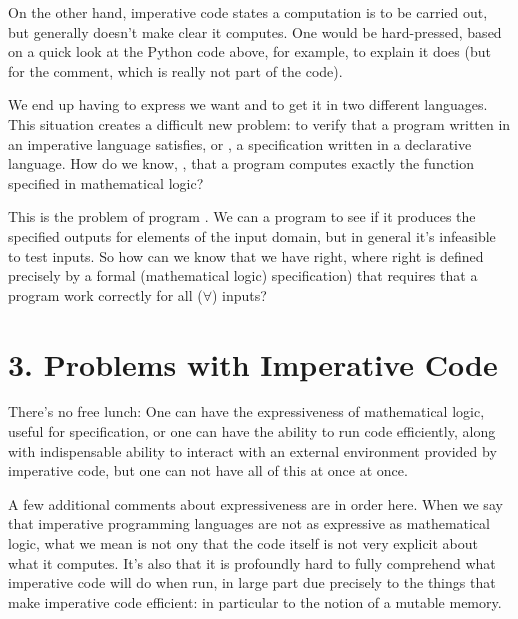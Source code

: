 \documentclass[letterpaper,10pt,english]{sphinxmanual}
\begin{document}
On the other hand, imperative code states  a computation is to be
carried out, but generally doesn’t make clear  it computes. One
would be hard-pressed, based on a quick look at the Python code above,
for example, to explain  it does (but for the comment, which is
really not part of the code).

We end up having to express  we want and  to get it in two
different languages. This situation creates a difficult new problem:
to verify that a program written in an imperative language satisfies,
or , a specification written in a declarative language.  How
do we know, , that a program computes exactly the function
specified in mathematical logic?

This is the problem of program . We can  a program
to see if it produces the specified outputs for  elements of the
input domain, but in general it’s infeasible to test  inputs. So
how can we know that we have  right, where right is
defined precisely by a formal (mathematical logic) specification) that
requires that a program work correctly for all (\(\forall\)) inputs?


\chapter{3. Problems with Imperative Code}
\label{\detokenize{03-problems-with-imperative-code::doc}}\label{\detokenize{03-problems-with-imperative-code:problems-with-imperative-code}}
There’s no free lunch: One can have the expressiveness of mathematical
logic, useful for specification, or one can have the ability to run
code efficiently, along with indispensable ability to interact with an
external environment provided by imperative code, but one can not have
all of this at once at once.

A few additional comments about expressiveness are in order here. When
we say that imperative programming languages are not as expressive as
mathematical logic, what we mean is not ony that the code itself is not
very explicit about what it computes. It’s also that it is profoundly
hard to fully comprehend what imperative code will do when run, in large
part due precisely to the things that make imperative code efficient: in
particular to the notion of a mutable memory.
\end{document}
